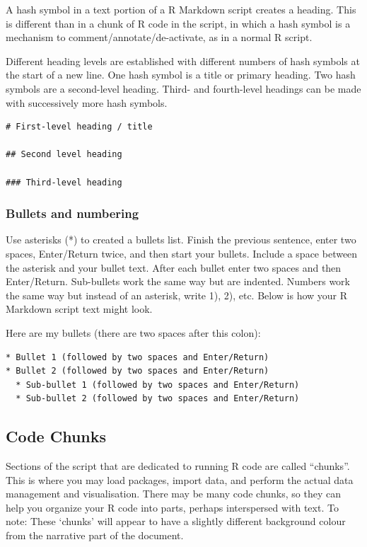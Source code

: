 \documentclass[
]{book}
\begin{document}
A hash symbol in a text portion of a R Markdown script creates a heading. This is different than in a chunk of R code in the script, in which a hash symbol is a mechanism to comment/annotate/de-activate, as in a normal R script.

Different heading levels are established with different numbers of hash symbols at the start of a new line. One hash symbol is a title or primary heading. Two hash symbols are a second-level heading. Third- and fourth-level headings can be made with successively more hash symbols.

\begin{verbatim}
# First-level heading / title

## Second level heading  

### Third-level heading
\end{verbatim}

\hypertarget{bullets-and-numbering}{%
\subsubsection{Bullets and numbering}\label{bullets-and-numbering}}

Use asterisks (*) to created a bullets list. Finish the previous sentence, enter two spaces, Enter/Return twice, and then start your bullets. Include a space between the asterisk and your bullet text. After each bullet enter two spaces and then Enter/Return. Sub-bullets work the same way but are indented. Numbers work the same way but instead of an asterisk, write 1), 2), etc. Below is how your R Markdown script text might look.

Here are my bullets (there are two spaces after this colon):

\begin{verbatim}
* Bullet 1 (followed by two spaces and Enter/Return)  
* Bullet 2 (followed by two spaces and Enter/Return)  
  * Sub-bullet 1 (followed by two spaces and Enter/Return)  
  * Sub-bullet 2 (followed by two spaces and Enter/Return)  
\end{verbatim}

\hypertarget{code-chunks}{%
\subsection{Code Chunks}\label{code-chunks}}

Sections of the script that are dedicated to running R code are called ``chunks''. This is where you may load packages, import data, and perform the actual data management and visualisation. There may be many code chunks, so they can help you organize your R code into parts, perhaps interspersed with text. To note: These `chunks' will appear to have a slightly different background colour from the narrative part of the document.
\end{document}
